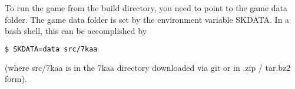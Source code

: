 
To run the game from the build directory, you need to point to the game data folder. The game data folder is set by the environment variable SKDATA. In a bash shell, this can be accomplished by

\begin{lstlisting}[language=bash]
$ SKDATA=data src/7kaa
\end{lstlisting}

(where src/7kaa is in the 7kaa directory downloaded via git or in .zip / tar.bz2 form).





